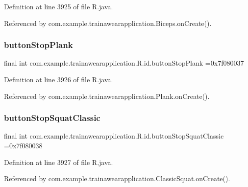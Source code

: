 Definition at line 3925 of file R.\+java.



Referenced by com.\+example.\+trainawearapplication.\+Biceps.\+on\+Create().

\mbox{\label{classcom_1_1example_1_1trainawearapplication_1_1_r_1_1id_af3e257d6cc2a93bf4fdd9bceb86da818}} 
\subsubsection{\texorpdfstring{buttonStopPlank}{buttonStopPlank}}
{\footnotesize\ttfamily final int com.\+example.\+trainawearapplication.\+R.\+id.\+button\+Stop\+Plank =0x7f080037\hspace{0.3cm}{\ttfamily [static]}}



Definition at line 3926 of file R.\+java.



Referenced by com.\+example.\+trainawearapplication.\+Plank.\+on\+Create().

\mbox{\label{classcom_1_1example_1_1trainawearapplication_1_1_r_1_1id_a6118ced90640f275b1182a3ba9d6301b}} 
\subsubsection{\texorpdfstring{buttonStopSquatClassic}{buttonStopSquatClassic}}
{\footnotesize\ttfamily final int com.\+example.\+trainawearapplication.\+R.\+id.\+button\+Stop\+Squat\+Classic =0x7f080038\hspace{0.3cm}{\ttfamily [static]}}



Definition at line 3927 of file R.\+java.



Referenced by com.\+example.\+trainawearapplication.\+Classic\+Squat.\+on\+Create().

